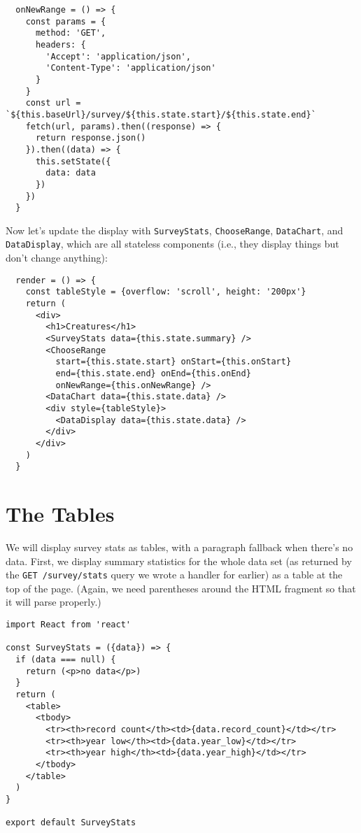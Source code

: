 \begin{verbatim}
  onNewRange = () => {
    const params = {
      method: 'GET',
      headers: {
        'Accept': 'application/json',
        'Content-Type': 'application/json'
      }
    }
    const url = `${this.baseUrl}/survey/${this.state.start}/${this.state.end}`
    fetch(url, params).then((response) => {
      return response.json()
    }).then((data) => {
      this.setState({
        data: data
      })
    })
  }
\end{verbatim}

Now let's update the display with \texttt{SurveyStats},
\texttt{ChooseRange}, \texttt{DataChart}, and \texttt{DataDisplay},
which are all stateless components
(i.e., they display things but don't change anything):

\begin{verbatim}
  render = () => {
    const tableStyle = {overflow: 'scroll', height: '200px'}
    return (
      <div>
        <h1>Creatures</h1>
        <SurveyStats data={this.state.summary} />
        <ChooseRange
          start={this.state.start} onStart={this.onStart}
          end={this.state.end} onEnd={this.onEnd}
          onNewRange={this.onNewRange} />
        <DataChart data={this.state.data} />
        <div style={tableStyle}>
          <DataDisplay data={this.state.data} />
        </div>
      </div>
    )
  }
\end{verbatim}

\section{The Tables}\label{s:capstone-tables}

We will display survey stats as tables,
with a paragraph fallback when there's no data.
First, we display summary statistics for the whole data set
(as returned by the \texttt{GET\ /survey/stats} query we wrote a handler for earlier)
as a table at the top of the page.
(Again, we need parentheses around the HTML fragment so that it will parse properly.)

\begin{verbatim}
import React from 'react'

const SurveyStats = ({data}) => {
  if (data === null) {
    return (<p>no data</p>)
  }
  return (
    <table>
      <tbody>
        <tr><th>record count</th><td>{data.record_count}</td></tr>
        <tr><th>year low</th><td>{data.year_low}</td></tr>
        <tr><th>year high</th><td>{data.year_high}</td></tr>
      </tbody>
    </table>
  )
}

export default SurveyStats
\end{verbatim}

